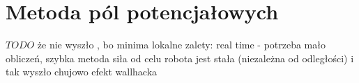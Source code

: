 \section{Metoda pól potencjałowych}
\label{ch:potential-fields}
$TODO$ że nie wyszło , bo minima lokalne
zalety: real time - potrzeba mało obliczeń, szybka metoda
siła od celu robota jest stała (niezależna od odległości)
i tak wyszło chujowo
efekt wallhacka